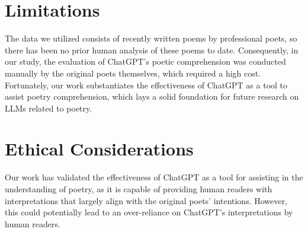 \documentclass[11pt]{article}
\begin{document}


\section*{Limitations}
The data we utilized consists of recently written poems by professional poets, so there has been no prior human analysis of these poems to date. Consequently, in our study, the evaluation of ChatGPT's poetic comprehension was conducted manually by the original poets themselves, which required a high cost. Fortunately, our work substantiates the effectiveness of ChatGPT as a tool to assist poetry comprehension, which lays a solid foundation for future research on LLMs related to poetry.





\section*{Ethical Considerations}
Our work has validated the effectiveness of ChatGPT as a tool for assisting in the understanding of poetry, as it is capable of providing human readers with interpretations that largely align with the original poets' intentions. However, this could potentially lead to an over-reliance on ChatGPT's interpretations by human readers.
\end{document}
